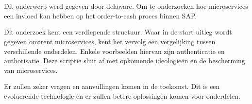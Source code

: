 
%
%

%



\chapter*{}


Dit onderwerp werd gegeven door delaware. Om te onderzoeken hoe microservices een invloed kan hebben op het order-to-cash proces binnen SAP. 

Dit onderzoek kent een verdiepende structuur. Waar in de start uitleg wordt gegeven omtrent microservices, kent het vervolg een vergelijking tussen verschillende onderdelen. Enkele voorbeelden hiervan zijn authenticatie en authorisatie. Deze scriptie sluit af met opkomende ideologieën en de bescherming van microservices.




Er zullen zeker vragen en aanvullingen komen in de toekomst. Dit is een evoluerende technologie en er zullen betere oplossingen komen voor onderdelen.